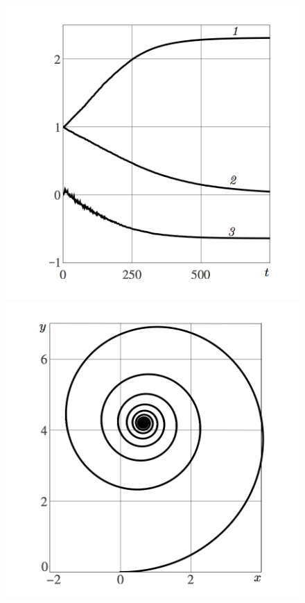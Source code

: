 
\begin{figure}[H]
    \hspace{-20pt}
        \vspace{10pt}
        \includegraphics[scale=1.2]{pic/figure7_1.png}
    \endminipage
        \includegraphics[scale=1.2]{pic/figure7_3.png}
    \endminipage
\end{figure}
